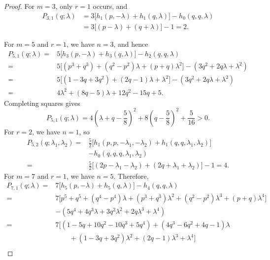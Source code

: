\documentclass[11pt]{article}
\theoremstyle{remark}
\numberwithin{equation}{section}
\begin{document}
\begin{proof}
  For $m=3$, only $r=1$ occurs, and
  \[
    \begin{aligned}
      P_{3,1}(q;\lambda)
      &=3\bigl[h_1(p,-\lambda)+h_1(q,\lambda)\bigr]
        -h_0(q,q,\lambda)\\
      &=3\bigl[(p-\lambda)+(q+\lambda)\bigr]-1=2.
    \end{aligned}
  \]

  For $m=5$ and $r=1$, we have $n=3$, and hence
  \[
    \begin{aligned}
      P_{5,1}(q;\lambda)
      ={}&5\bigl[h_3(p,-\lambda)+h_3(q,\lambda)\bigr]
          -h_2(q,q,\lambda)\\
      ={}&5\bigl[(p^3+q^3)+(q^2-p^2)\lambda
                  +(p+q)\lambda^2\bigr]
         -(3q^2+2q\lambda+\lambda^2)\\
      ={}&5\bigl[(1-3q+3q^2)+(2q-1)\lambda+\lambda^2\bigr]
         -(3q^2+2q\lambda+\lambda^2)\\
      ={}&4\lambda^2+(8q-5)\lambda+12q^2-15q+5.
    \end{aligned}
  \]
  Completing squares gives
  \[
    P_{5,1}(q;\lambda)
    =4\left(\lambda+q-\frac58\right)^2
     +8\left(q-\frac58\right)^2+\frac5{16}>0.
  \]
  For $r=2$, we have $n=1$, so
  \[
    \begin{aligned}
      P_{5,2}(q;\lambda_1,\lambda_2)
      ={}&\frac52\bigl[
        h_1(p,p,-\lambda_1,-\lambda_2)
        +h_1(q,q,\lambda_1,\lambda_2)\bigr]\\
        &-h_0(q,q,q,\lambda_1,\lambda_2)\\
      ={}&\frac52\bigl[(2p-\lambda_1-\lambda_2)
                       +(2q+\lambda_1+\lambda_2)\bigr]-1=4.
    \end{aligned}
  \]
  For $m=7$ and $r=1$, we have $n=5$.  Therefore,
  \[
    \begin{aligned}
      P_{7,1}(q;\lambda)
      ={}&7\bigl[h_5(p,-\lambda)+h_5(q,\lambda)\bigr]
          -h_4(q,q,\lambda)\\
      ={}&7\bigl[p^5+q^5+(q^4-p^4)\lambda
          +(p^3+q^3)\lambda^2+(q^2-p^2)\lambda^3
          +(p+q)\lambda^4\bigr]\\
         &-(5q^4+4q^3\lambda+3q^2\lambda^2
             +2q\lambda^3+\lambda^4)\\
      ={}&7\bigl[(1-5q+10q^2-10q^3+5q^4)
          +(4q^3-6q^2+4q-1)\lambda\\
         &\qquad +(1-3q+3q^2)\lambda^2
          +(2q-1)\lambda^3+\lambda^4\bigr]\\

\end{aligned}\]
\end{proof}
\end{document}
